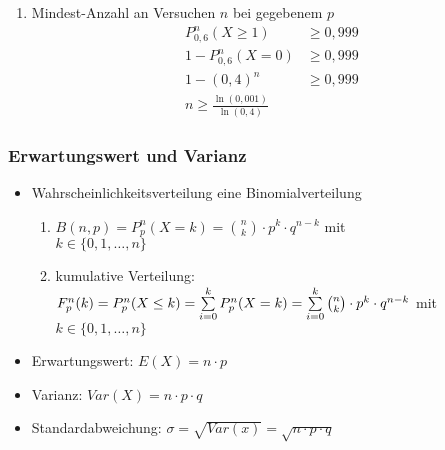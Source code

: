 \documentclass[a4paper,twocolumn,10pt]{onepgnote1}
\begin{document}
\begin{itemize}
\begin{enumerate}
    \item Mindest-Anzahl an Versuchen $n$ bei gegebenem $p$
    \begin{equation*}
        \begin{split}
            P^n_{0,6}(X\geq 1) &\geq 0,999\\
            1-P^n_{0,6}(X=0)&\geq 0,999\\
            1-(0,4)^n &\geq 0,999\\
           n\geq \frac{\ln{(0,001)}}{\ln{(0,4)}}
        \end{split}
    \end{equation*}
\end{enumerate}
\end{itemize}
\subsubsection{Erwartungswert und Varianz}
\begin{itemize}
    \item Wahrscheinlichkeitsverteilung eine Binomialverteilung\\
    \begin{enumerate}
        \item $B(n,p) = P_p^n(X=k) = \binom{n}{k} \cdot p^k \cdot q^{n-k}$ mit\\ $k\in \{0, 1, \ldots, n\}$\\
        \item kumulative Verteilung:\\ $F_p^n(k) = P_p^n(X\leq k)=\sum\limits_{i=0}^k P_p^n(X=k)\\ =\sum\limits_{i=0}^k \binom{n}{k} \cdot p^k \cdot q^{n-k}$ mit $k\in \{0, 1, \ldots, n\}$
    \end{enumerate}
    \item Erwartungswert: $E(X) = n\cdot p$
    \item Varianz: $Var(X)= n\cdot p \cdot q$
    \item Standardabweichung: $\sigma = \sqrt{Var(x)} = \sqrt{n\cdot p \cdot q}$
\end{itemize}
\end{document}

